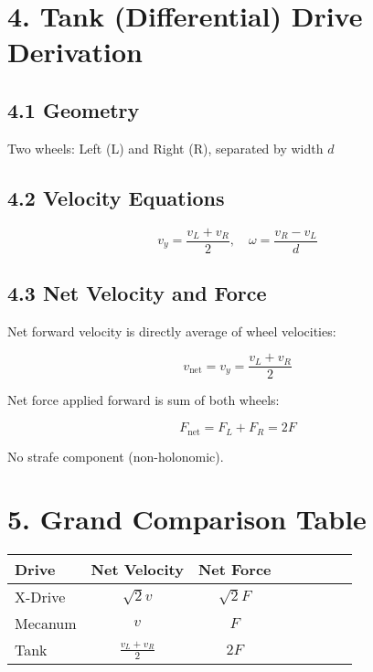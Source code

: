 \documentclass{article}
\begin{document}
\section*{4. Tank (Differential) Drive Derivation}

\subsection*{4.1 Geometry}

Two wheels: Left (L) and Right (R), separated by width \( d \)

\subsection*{4.2 Velocity Equations}

\[
v_y = \frac{v_L + v_R}{2}, \quad
\omega = \frac{v_R - v_L}{d}
\]

\subsection*{4.3 Net Velocity and Force}

Net forward velocity is directly average of wheel velocities:

\[
v_{\text{net}} = v_y = \frac{v_L + v_R}{2}
\]

Net force applied forward is sum of both wheels:

\[
F_{\text{net}} = F_L + F_R = 2F
\]

No strafe component (non-holonomic).



\section*{5. Grand Comparison Table}

\begin{center}
\begin{tabular}{|l|c|c|c|c|c|c|c|}
\hline
\textbf{Drive} & \textbf{Net Velocity} & \textbf{Net Force} \\
\hline
X-Drive & \( \sqrt{2} v \) & \( \sqrt{2} F \) \\
\hline
Mecanum & \( v \) & \( F \) \\
\hline
Tank & \( \frac{v_L + v_R}{2} \) & \( 2F \) \\
\hline
\end{tabular}
\end{center}
\end{document}
